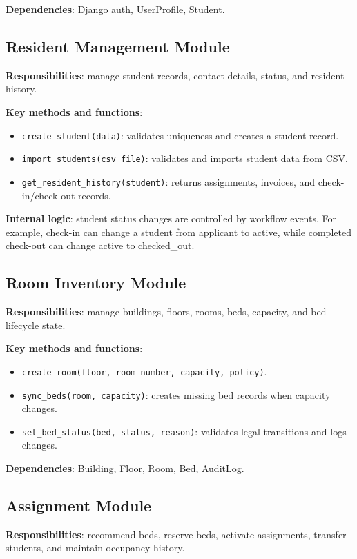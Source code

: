 \documentclass[11pt,a4paper]{article}
\begin{document}
\textbf{Dependencies}: Django auth, UserProfile, Student.

\subsection{Resident Management Module}
\textbf{Responsibilities}: manage student records, contact details, status, and resident history.

\textbf{Key methods and functions}:
\begin{itemize}
  \item \texttt{create\_student(data)}: validates uniqueness and creates a student record.
  \item \texttt{import\_students(csv\_file)}: validates and imports student data from CSV.
  \item \texttt{get\_resident\_history(student)}: returns assignments, invoices, and check-in/check-out records.
\end{itemize}

\textbf{Internal logic}: student status changes are controlled by workflow events. For example, check-in can change a student from applicant to active, while completed check-out can change active to checked\_out.

\subsection{Room Inventory Module}
\textbf{Responsibilities}: manage buildings, floors, rooms, beds, capacity, and bed lifecycle state.

\textbf{Key methods and functions}:
\begin{itemize}
  \item \texttt{create\_room(floor, room\_number, capacity, policy)}.
  \item \texttt{sync\_beds(room, capacity)}: creates missing bed records when capacity changes.
  \item \texttt{set\_bed\_status(bed, status, reason)}: validates legal transitions and logs changes.
\end{itemize}

\textbf{Dependencies}: Building, Floor, Room, Bed, AuditLog.

\subsection{Assignment Module}
\textbf{Responsibilities}: recommend beds, reserve beds, activate assignments, transfer students, and maintain occupancy history.
\end{document}
